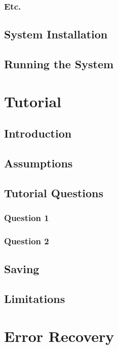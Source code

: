 \subsubsection{Etc.}

\subsection{System Installation}

\subsection{Running the System}

\section{Tutorial}

\subsection{Introduction}

\subsection{Assumptions}

\subsection{Tutorial Questions}

\subsubsection{Question 1}

\subsubsection{Question 2}

\subsection{Saving}

\subsection{Limitations}

\section{Error Recovery}

